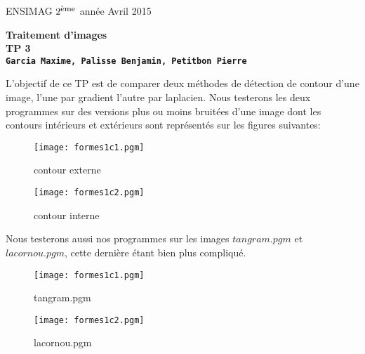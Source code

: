 \documentclass[12pt]{article}
\newcommand{\noi}{\noindent}
\numberwithin{equation}{section}
\begin{document}
\baselineskip7mm

\noi ENSIMAG $2^{\footnotesize \mbox{ème}}$ année   \hfill Avril 2015


\vspace{1cm}


\begin{center}
{\Large \bf Traitement d'images\\ TP 3 \\ \texttt{Garcia Maxime, Palisse Benjamin, Petitbon Pierre}}
\end{center}

\vspace{5mm}

L'objectif de ce TP est de comparer deux méthodes de détection de contour d'une image, l'une par gradient l'autre par laplacien. Nous testerons les deux programmes sur des versions plus ou moins bruitées d'une image dont les contours intérieurs et extérieurs sont représentés sur les figures suivantes:


	\begin{figure}[!ht]
        \begin{center}
           \texttt{[image: formes1c1.pgm]} 
           \caption{contour externe}
        \end{center}
    \end{figure}

	\begin{figure}[!ht]
        \begin{center}
           \texttt{[image: formes1c2.pgm]} 
           \caption{contour interne}
        \end{center}
    \end{figure}

Nous testerons aussi nos programmes sur les images $tangram.pgm$ et $lacornou.pgm$, cette dernière étant bien plus compliqué.

 	\begin{figure}[!ht]
        \begin{center}
           \texttt{[image: formes1c1.pgm]} 
           \caption{tangram.pgm}
        \end{center}
    \end{figure}

	\begin{figure}[!ht]
        \begin{center}
           \texttt{[image: formes1c2.pgm]} 
           \caption{lacornou.pgm}
        \end{center}
    \end{figure}
\end{document}
